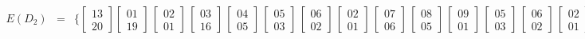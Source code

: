 \[\begin{array}{rcl}
E(D_2) &=& \{ \begin{bmatrix} 13 \\ 20 \end{bmatrix} \begin{bmatrix} 01 \\ 19 \end{bmatrix}\,\begin{bmatrix} 02 \\ 01 \end{bmatrix}\,\begin{bmatrix} 03 \\ 16 \end{bmatrix}\,\begin{bmatrix} 04 \\ 05 \end{bmatrix}\,\begin{bmatrix} 05 \\ 03 \end{bmatrix}\,\begin{bmatrix} 06 \\ 02 \end{bmatrix}\,\begin{bmatrix} 02 \\ 01 \end{bmatrix}\,\begin{bmatrix} 07 \\ 06 \end{bmatrix}\,\begin{bmatrix} 08 \\ 05 \end{bmatrix}\,\begin{bmatrix} 09 \\ 01 \end{bmatrix}\,\begin{bmatrix} 05 \\ 03 \end{bmatrix}\,\begin{bmatrix} 06 \\ 02 \end{bmatrix}\,\begin{bmatrix} 02 \\ 01 \end{bmatrix}\,\begin{bmatrix} 10 \\ 03 \end{bmatrix}\,\begin{bmatrix} 11 \\ 02 \end{bmatrix}\,\begin{bmatrix} 12 \\ 01 \end{bmatrix}\,\begin{bmatrix} 09 \\ 01 \end{bmatrix} \} \\[1.8em]

\end{array}\]
